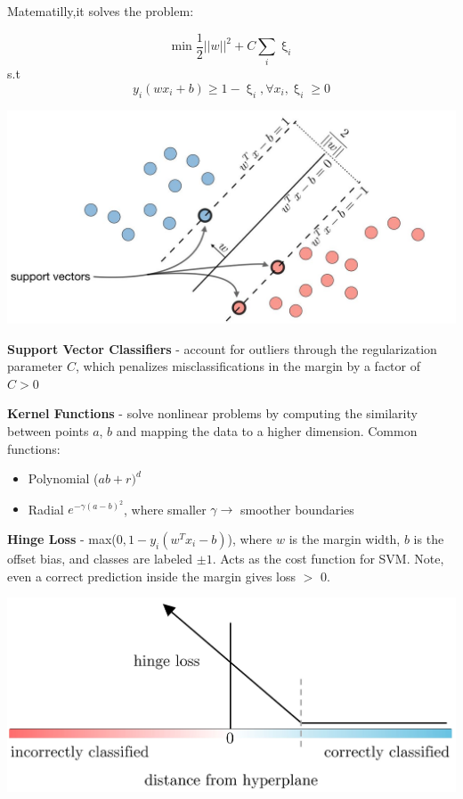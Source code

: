 \documentclass[10pt,landscape]{article}
\begin{document}
\begin{multicols}{3}
    Matematilly,it solves the problem: 
    
    $$\min \frac{1}{2}||w||^2 + C \sum_i \upxi_i $$
    s.t $$y_i(wx_i+b)\geq 1-\upxi_i, \forall x_i, \upxi_i\geq 0 $$
    \vspace{-2.5mm}
    \begin{center}
        \includegraphics[scale = .23]{images/svmNew2.JPG}
    \end{center}

    \vspace{-2mm}
    \textbf{Support Vector Classifiers} - account for outliers through the regularization parameter $C$, which penalizes misclassifications in the margin by a factor of $C > 0$

    \textbf{Kernel Functions} - solve nonlinear problems by computing the similarity between points $a$, $b$ and mapping the data to a higher dimension. Common functions:
    \begin{itemize}[label={--},leftmargin=4mm]
        \vspace{-1mm}
        \itemsep -.4mm
        \item Polynomial ($ab + r)^d$
        \item Radial $e^{-\gamma(a-b)^2}$, where smaller $\gamma \to$  smoother boundaries
    \end{itemize}

    \textbf{Hinge Loss} - max($0,1-y_i(w^T x_i - b)$), where
    $w$ is the margin width, $b$ is the offset bias, and classes are labeled $\pm1$. Acts as the cost function for SVM. Note, even a correct prediction inside the margin gives loss $>$ 0.
    \vspace{-1mm}
    \begin{center}
        \includegraphics[scale = .105]{images/hingeloss3.JPG}
    \end{center}
    \vspace{-3.5mm}

\end{multicols}
\end{document}
